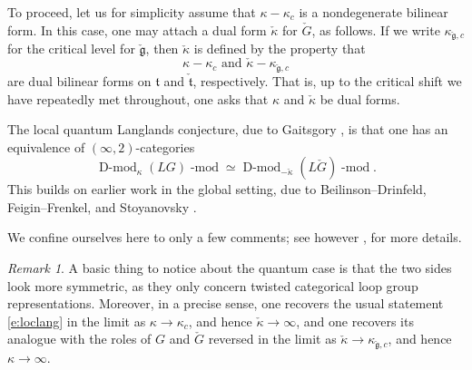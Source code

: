 \documentclass[10pt]{amsart}
\newcommand{\LS}{\on{LocSys}_{\cG}}
\newcommand{\fg}{\mathfrak{g}}
\newcommand{\on}{\operatorname}
\renewcommand{\mod}{\on{-mod}}
\newcommand{\Dmod}{\on{D-mod}}
\theoremstyle{remark}
\newtheorem{re}[subsubsection]{Remark}
\newcommand{\ft}{\mathfrak{t}}
\numberwithin{equation}{section}
\newcommand{\cfg}{\check{\fg}}
\newcommand{\cG}{\check{G}}
\renewcommand{\mod}{\operatorname{-mod}}
\newcommand{\QCoh}{\on{QCoh}}
\begin{document}
    To proceed, let us for simplicity assume 
    that $\kappa - \kappa_c$ is a nondegenerate bilinear form. In this case, 
    one may attach a dual form $\check{\kappa}$ for $\cG$, as follows. If we 
    write $\kappa_{\cfg, c}$ for the critical level for $\cfg$, then 
    $\check{\kappa}$ is defined by the property 
    that $$\kappa - \kappa_c \text{ and } \check{\kappa} - \kappa_{\cfg, c}$$ 
    are dual 
    bilinear forms on $\ft$ and $\check{\ft}$, respectively. That is, up to the 
    critical shift we have repeatedly met throughout, one asks that $\kappa$ 
    and $\check{\kappa}$ be dual forms.  
    
    The local quantum Langlands conjecture, due to Gaitsgory \cite{quantum-langlands-summary}, is that one has an 
    equivalence of 
    $(\infty,2)$-categories 
    $$\Dmod_\kappa(LG)\mod \simeq \Dmod_{-\check{\kappa}}(L\cG)\mod.$$
    This builds on earlier work in the global setting, due to 
    Beilinson--Drinfeld, Feigin--Frenkel, and Stoyanovsky \cite{stoyanovsky}. 
    
     We confine ourselves here to only a few comments; see however \cite{winter-langlands-summary}, \cite{paris-notes} for more details. 
    
    
    \begin{re} A basic thing to notice about the quantum case is that the two 
    sides look more symmetric, as they only concern twisted categorical loop 
    group 
    representations. Moreover, in a precise sense, one recovers the usual 
    statement \eqref{e:loclang} in the limit as $\kappa \rightarrow \kappa_c$, 
    and hence $\check{\kappa} \rightarrow \infty$, and one recovers its analogue with the 
    roles of $G$ and $\cG$ reversed in the limit as $\check{\kappa} \rightarrow 
    \kappa_{\cfg, c}$, and hence $\kappa \rightarrow \infty$. 	
    	\end{re}
    	
    	

    
\end{document}
